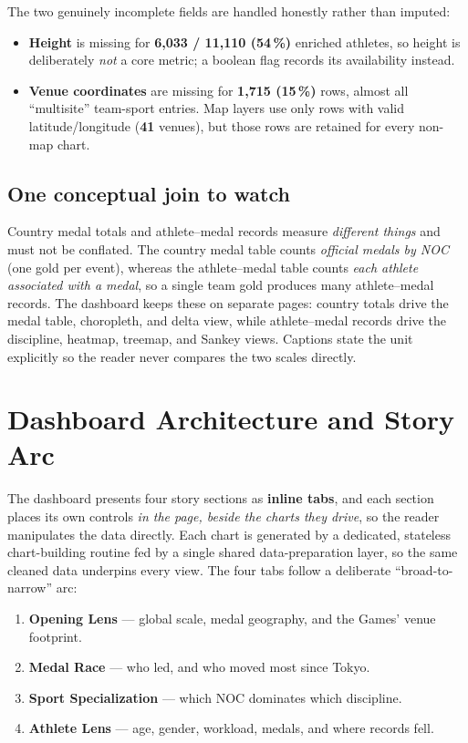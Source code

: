 \documentclass[11pt]{article}
\begin{document}
The two genuinely incomplete fields are handled honestly rather than imputed:

\begin{itemize}
  \item \textbf{Height} is missing for \textbf{6{,}033 / 11{,}110 (54\,\%)}
        enriched athletes, so height is deliberately \emph{not} a core metric; a
        boolean flag records its availability instead.
  \item \textbf{Venue coordinates} are missing for \textbf{1{,}715 (15\,\%)}
        rows, almost all ``multisite'' team-sport entries. Map layers use only
        rows with valid latitude/longitude (\textbf{41} venues), but those rows
        are retained for every non-map chart.
\end{itemize}

\subsection{One conceptual join to watch}
\label{sub:concept}
Country medal totals and athlete--medal records measure \emph{different things}
and must not be conflated. The country medal table counts \emph{official
medals by NOC} (one gold per event), whereas the athlete--medal table counts
\emph{each athlete associated with a medal}, so a single team gold produces many
athlete--medal records. The dashboard keeps these on separate pages: country
totals drive the medal table, choropleth, and delta view, while athlete--medal
records drive the discipline, heatmap, treemap, and Sankey views. Captions state
the unit explicitly so the reader never compares the two scales directly.

\section{Dashboard Architecture and Story Arc}
\label{sec:arc}

The dashboard presents four story sections as \textbf{inline tabs}, and each section
places its own controls \emph{in the page, beside the charts they drive}, so the
reader manipulates the data directly. Each chart is
generated by a dedicated, stateless chart-building routine fed by a single shared
data-preparation layer, so the same cleaned data underpins every view. The four
tabs follow a deliberate ``broad-to-narrow'' arc:

\begin{enumerate}[label=\textbf{\arabic*.},leftmargin=2em]
  \item \textbf{Opening Lens} --- global scale, medal geography, and the Games' venue footprint.
  \item \textbf{Medal Race} --- who led, and who moved most since Tokyo.
  \item \textbf{Sport Specialization} --- which NOC dominates which discipline.
  \item \textbf{Athlete Lens} --- age, gender, workload, medals, and where records fell.
\end{enumerate}
\end{document}
